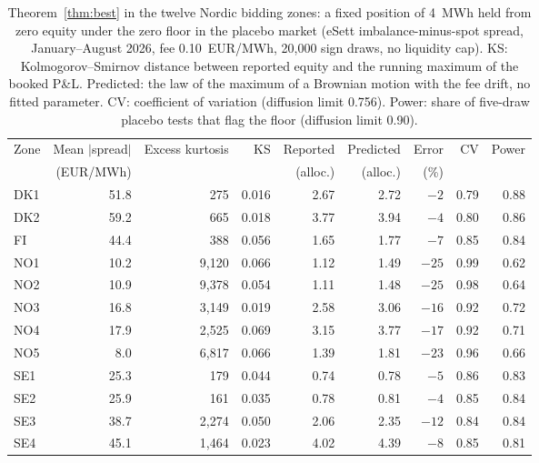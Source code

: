 \begin{table}[!htbp]
\centering
\caption{Theorem~\ref{thm:best} in the twelve Nordic bidding zones: a fixed position of 4~MWh held from zero equity under the zero floor in the placebo market (eSett imbalance-minus-spot spread, January--August 2026, fee 0.10~EUR/MWh, 20,000 sign draws, no liquidity cap). KS: Kolmogorov--Smirnov distance between reported equity and the running maximum of the booked P\&L. Predicted: the law of the maximum of a Brownian motion with the fee drift, no fitted parameter. CV: coefficient of variation (diffusion limit 0.756). Power: share of five-draw placebo tests that flag the floor (diffusion limit 0.90).}
\label{tab:zones}
\footnotesize
\setlength{\tabcolsep}{4pt}
\begin{tabular}{@{}lrrrrrrrr@{}}
\toprule
Zone & Mean $|$spread$|$ & Excess kurtosis & KS & Reported & Predicted & Error & CV & Power \\
 & (EUR/MWh) & & & (alloc.) & (alloc.) & (\%) & & \\
\midrule
DK1 & 51.8 & 275 & 0.016 & 2.67 & 2.72 & $-2$ & 0.79 & 0.88 \\
DK2 & 59.2 & 665 & 0.018 & 3.77 & 3.94 & $-4$ & 0.80 & 0.86 \\
FI & 44.4 & 388 & 0.056 & 1.65 & 1.77 & $-7$ & 0.85 & 0.84 \\
NO1 & 10.2 & 9,120 & 0.066 & 1.12 & 1.49 & $-25$ & 0.99 & 0.62 \\
NO2 & 10.9 & 9,378 & 0.054 & 1.11 & 1.48 & $-25$ & 0.98 & 0.64 \\
NO3 & 16.8 & 3,149 & 0.019 & 2.58 & 3.06 & $-16$ & 0.92 & 0.72 \\
NO4 & 17.9 & 2,525 & 0.069 & 3.15 & 3.77 & $-17$ & 0.92 & 0.71 \\
NO5 & 8.0 & 6,817 & 0.066 & 1.39 & 1.81 & $-23$ & 0.96 & 0.66 \\
SE1 & 25.3 & 179 & 0.044 & 0.74 & 0.78 & $-5$ & 0.86 & 0.83 \\
SE2 & 25.9 & 161 & 0.035 & 0.78 & 0.81 & $-4$ & 0.85 & 0.84 \\
SE3 & 38.7 & 2,274 & 0.050 & 2.06 & 2.35 & $-12$ & 0.84 & 0.84 \\
SE4 & 45.1 & 1,464 & 0.023 & 4.02 & 4.39 & $-8$ & 0.85 & 0.81 \\
\bottomrule
\end{tabular}
\end{table}
